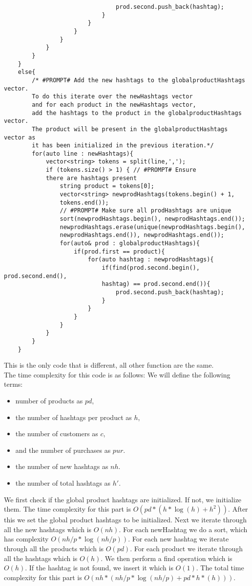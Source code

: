 \documentclass[12pt]{article}
\begin{document}
\begin{verbatim}
                                prod.second.push_back(hashtag);
                            }
                        }
                    }
                }
            }
        }
    }
    else{
        /* #PROMPT# Add the new hashtags to the globalproductHashtags vector. 
        To do this iterate over the newHashtags vector 
        and for each product in the newHashtags vector, 
        add the hashtags to the product in the globalproductHashtags vector. 
        The product will be present in the globalproductHashtags vector as 
        it has been initialized in the previous iteration.*/
        for(auto line : newHashtags){
            vector<string> tokens = split(line,',');
            if (tokens.size() > 1) { // #PROMPT# Ensure 
            there are hashtags present
                string product = tokens[0];
                vector<string> newprodHashtags(tokens.begin() + 1, 
                tokens.end());
                // #PROMPT# Make sure all prodHashtags are unique
                sort(newprodHashtags.begin(), newprodHashtags.end());
                newprodHashtags.erase(unique(newprodHashtags.begin(), 
                newprodHashtags.end()), newprodHashtags.end());
                for(auto& prod : globalproductHashtags){
                    if(prod.first == product){
                        for(auto hashtag : newprodHashtags){
                            if(find(prod.second.begin(), prod.second.end(), 
                            hashtag) == prod.second.end()){
                                prod.second.push_back(hashtag);
                            }
                        }
                    }
                }
            }
        }
    }
\end{verbatim}
This is the only code that is different, all other function are the same.\\
The time complexity for this code is as follows:
We will define the following terms:
\begin{itemize}
    \item number of products as $pd$,
    \item the number of hashtags per product as $h$, 
    \item the number of customers as $c$, 
    \item and the number of purchases as $pur$.
    \item the number of new hashtags as $nh$.
    \item the number of total hashtags as $h'$.
\end{itemize}
We first check if the global product hashtags are initialized. If not, we initialize them. The time complexity for this part is $O(pd*(h*\log(h) + h^2))$. After this we set the global product hashtags to be initialized. Next we iterate through all the new hashtags which is $O(nh)$. For each newHashtag we do a sort, which has complexity $O(nh/p* \log(nh/p))$. For each new hashtag we iterate through all the products which is $O(pd)$. For each product we iterate through all the hashtags which is $O(h)$. We then perform a find operation which is $O(h)$. If the hashtag is not found, we insert it which is $O(1)$. The total time complexity for this part is $O(nh*(nh/p * \log(nh/p) + pd*h*(h)))$.\\
\end{document}
